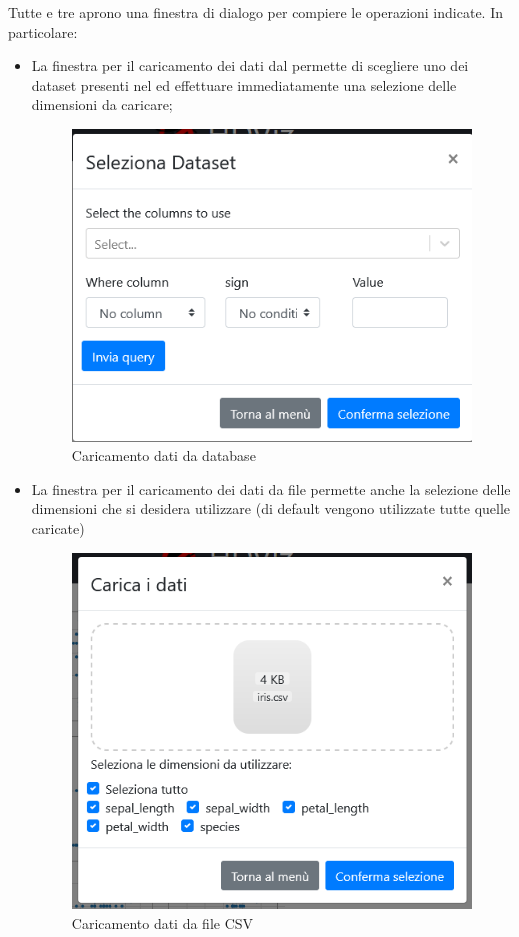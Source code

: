 Tutte e tre aprono una finestra di dialogo per compiere le operazioni indicate. In particolare:
\begin{itemize}
	\item La finestra per il caricamento dei dati dal  permette di scegliere uno dei dataset presenti nel  ed effettuare immediatamente una selezione delle dimensioni da caricare;
	\begin{figure}[H]
		\includegraphics[scale=0.5]{Images/CaricamentoDB.png}
		\centering
		\caption{Caricamento dati da database}
	\end{figure}
	\item  La finestra per il caricamento dei dati da file  permette anche la selezione delle dimensioni che si desidera utilizzare (di default vengono utilizzate tutte quelle caricate)
	\begin{figure}[H]
		\includegraphics[scale=0.5]{Images/CaricamentoCSV.png}
		\centering
		\caption{Caricamento dati da file CSV}
	\end{figure}
\end{itemize}

